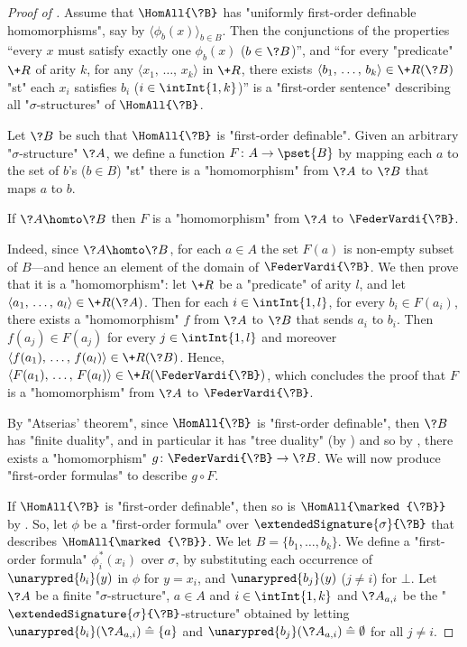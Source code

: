 \begin{proof}[Proof of ]
	 Assume that $\HomAll{\?B}$ has
	"uniformly first-order definable homomorphisms", say by $\langle \phi_b(x) \rangle_{b\in B}$.
	Then the conjunctions of the properties 
	``every $x$ must satisfy exactly one $\phi_b(x)$ ($b\in \?B$)'',
	and ``for every "predicate" $\+R$ of arity $k$, for any $\langle x_1,\, \dotsc,\, x_k \rangle$ in $\+R$, there exists $\langle b_1,\, \dotsc,\, b_k \rangle \in \+R(\?B)$ "st"
	each $x_i$ satisfies $b_i$ ($i \in \intInt{1,k}$)'' is a "first-order sentence"
	describing all "$\sigma$-structures" of $\HomAll{\?B}$.

	Let $\?B$ be such that $\HomAll{\?B}$ is "first-order definable".
	Given an arbitrary "$\sigma$-structure" $\?A$, we define a function $F\colon A \to \pset{B}$
	by mapping each $a$ to the set of $b$'s ($b \in B$) "st"
	there is a "homomorphism" from $\?A$ to $\?B$ that maps $a$ to $b$.
	\begin{claim}
		\label{claim:finite-duality-uniformly-definable-homomorphisms-homomorphism}
		If $\?A \homto \?B$ then $F$ is a "homomorphism" from $\?A$ to $\FederVardi{\?B}$.
	\end{claim}
	Indeed, since $\?A\homto\?B$, for each $a\in A$ the set
	$F(a)$ is non-empty subset of $B$---and hence an element of the domain of $\FederVardi{\?B}$.
	We then prove that it is a "homomorphism": let $\+R$ be a "predicate" of arity $l$,
	and let $\langle a_1,\,\dotsc,\,a_l \rangle \in \+R(\?A)$. Then for each $i \in \intInt{1,l}$, for every $b_i \in F(a_i)$, there exists a "homomorphism" $f$ from $\?A$ to $\?B$
	that sends $a_i$ to $b_i$. Then $f(a_j) \in F(a_j)$ for every $j\in \intInt{1,l}$
	and moreover $\langle f(a_1),\,\dotsc,\, f(a_l) \rangle \in \+R(\?B)$.
	Hence, $\langle F(a_1),\,\dotsc,\,F(a_l) \rangle \in \+R(\FederVardi{\?B})$,
	which concludes the proof that $F$ is a "homomorphism" from $\?A$ to $\FederVardi{\?B}$.

	By "Atserias' theorem", since $\HomAll{\?B}$ is "first-order definable",
	then $\?B$ has "finite duality", and in particular it has
	"tree duality" (by ) and so by
	, there exists a "homomorphism"
	$g\colon \FederVardi{\?B} \to \?B$.
	We will now produce "first-order formulas" to describe $g \circ F$.

	If $\HomAll{\?B}$ is "first-order definable", then so is
	$\HomAll{\marked{\?B}}$ by .
	So, let $\phi$ be a "first-order formula" over $\extendedSignature{\sigma}{\?B}$
	that describes $\HomAll{\marked{\?B}}$. We let $B = \{b_1,\dotsc,b_k\}$.
	We define a "first-order formula" $\phi^*_i(x_i)$ over $\sigma$,
	by substituting each occurrence of $\unarypred{b_i}(y)$ in $\phi$ for $y = x_i$,
	and $\unarypred{b_j}(y)$ ($j \neq i$) for $\bot$.
	Let $\?A$ be a finite "$\sigma$-structure", $a\in A$ and $i \in \intInt{1,k}$
	and $\?A_{a,i}$ be the
	"$\extendedSignature{\sigma}{\?B}$-structure" obtained by letting 
	$\unarypred{b_i}(\?A_{a,i}) \defeq \{a\}$
	and $\unarypred{b_j}(\?A_{a,i}) \defeq \emptyset$ for all $j \neq i$.


\end{proof}
